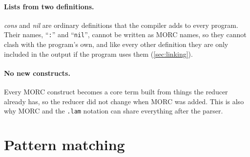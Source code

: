\documentclass[11pt,a4paper]{article}
\theoremstyle{definition}
\theoremstyle{plain}
\begin{document}
\paragraph{Lists from two definitions.} \textit{cons} and \textit{nil} are
ordinary definitions that the compiler adds to every program. Their names,
``\texttt{:}'' and ``\texttt{nil}'', cannot be written as MORC names, so they
cannot clash with the program's own, and like every other definition they
are only included in the output if the program uses them
(\cref{sec:linking}).

\paragraph{No new constructs.} Every MORC construct becomes a core term
built from things the reducer already has, so the reducer did not change
when MORC was added. This is also why MORC and the \texttt{.lam} notation can
share everything after the parser.

\section{Pattern matching}\label{sec:match}
\end{document}
